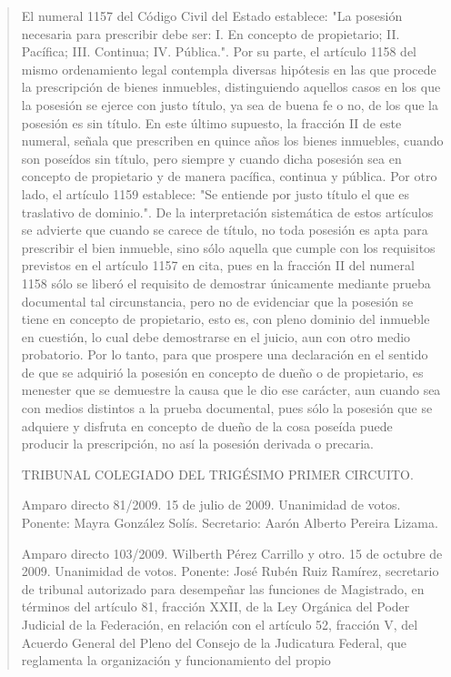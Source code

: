 \documentclass[11pt,a4paper]{article}
\begin{document}
\begin{quote}
El numeral 1157 del Código Civil del Estado establece: "La posesión necesaria para prescribir debe
ser: I. En concepto de propietario; II. Pacífica; III. Continua; IV. Pública.". Por su parte, el artículo
1158 del mismo ordenamiento legal contempla diversas hipótesis en las que procede la prescripción
de bienes inmuebles, distinguiendo aquellos casos en los que la posesión se ejerce con justo título,
ya sea de buena fe o no, de los que la posesión es sin título. En este último supuesto, la fracción II
de este numeral, señala que prescriben en quince años los bienes inmuebles, cuando son poseídos
sin título, pero siempre y cuando dicha posesión sea en concepto de propietario y de manera
pacífica, continua y pública. Por otro lado, el artículo 1159 establece: "Se entiende por justo título el
que es traslativo de dominio.". De la interpretación sistemática de estos artículos se advierte que
cuando se carece de título, no toda posesión es apta para prescribir el bien inmueble, sino sólo
aquella que cumple con los requisitos previstos en el artículo 1157 en cita, pues en la fracción II del
numeral 1158 sólo se liberó el requisito de demostrar únicamente mediante prueba documental tal
circunstancia, pero no de evidenciar que la posesión se tiene en concepto de propietario, esto es,
con pleno dominio del inmueble en cuestión, lo cual debe demostrarse en el juicio, aun con otro
medio probatorio. Por lo tanto, para que prospere una declaración en el sentido de que se adquirió
la posesión en concepto de dueño o de propietario, es menester que se demuestre la causa que le
dio ese carácter, aun cuando sea con medios distintos a la prueba documental, pues sólo la
posesión que se adquiere y disfruta en concepto de dueño de la cosa poseída puede producir la
prescripción, no así la posesión derivada o precaria.

TRIBUNAL COLEGIADO DEL TRIGÉSIMO PRIMER CIRCUITO.


Amparo directo 81/2009. 15 de julio de 2009. Unanimidad de votos. Ponente: Mayra González Solís.
Secretario: Aarón Alberto Pereira Lizama.

Amparo directo 103/2009. Wilberth Pérez Carrillo y otro. 15 de octubre de 2009. Unanimidad de
votos. Ponente: José Rubén Ruiz Ramírez, secretario de tribunal autorizado para desempeñar las
funciones de Magistrado, en términos del artículo 81, fracción XXII, de la Ley Orgánica del Poder
Judicial de la Federación, en relación con el artículo 52, fracción V, del Acuerdo General del Pleno
del Consejo de la Judicatura Federal, que reglamenta la organización y funcionamiento del propio



\end{quote}
\end{document}
